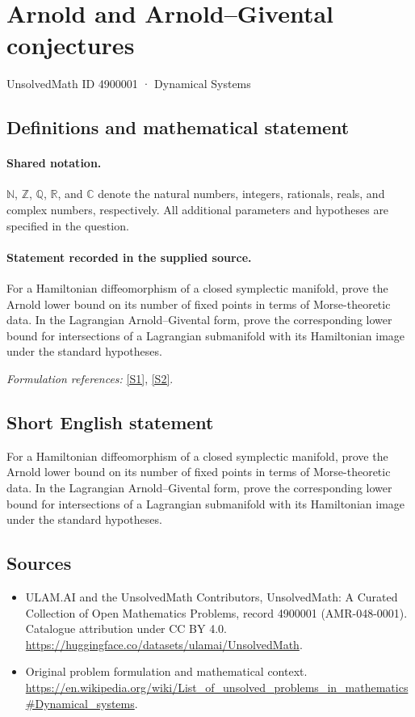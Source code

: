 \documentclass[11pt]{article}
\newcommand{\sref}[2]{\hyperlink{source:#1:#2}{[S#2]}}
\begin{document}
\setcounter{section}{4900000}
\section{Arnold and Arnold–Givental conjectures}\label{4900001}
{\small UnsolvedMath ID 4900001 · Dynamical Systems}
\subsection{Definitions and mathematical statement}

\paragraph{Shared notation.}$\mathbb N$, $\mathbb Z$, $\mathbb Q$, $\mathbb R$, and $\mathbb C$ denote the natural numbers, integers, rationals, reals, and complex numbers, respectively. All additional parameters and hypotheses are specified in the question.


\paragraph{Statement recorded in the supplied source.}
For a Hamiltonian diffeomorphism of a closed symplectic manifold, prove the Arnold lower bound on its number of fixed points in terms of Morse-theoretic data. In the Lagrangian Arnold–Givental form, prove the corresponding lower bound for intersections of a Lagrangian submanifold with its Hamiltonian image under the standard hypotheses.
\par\smallskip\textit{Formulation references:} \sref{4900001}{1}, \sref{4900001}{2}.
\subsection{Short English statement}
For a Hamiltonian diffeomorphism of a closed symplectic manifold, prove the Arnold lower bound on its number of fixed points in terms of Morse-theoretic data. In the Lagrangian Arnold–Givental form, prove the corresponding lower bound for intersections of a Lagrangian submanifold with its Hamiltonian image under the standard hypotheses.
\subsection{Sources}
\begin{itemize}
\item[\hypertarget{source:4900001:1}{S1}] ULAM.AI and the UnsolvedMath Contributors, UnsolvedMath: A Curated Collection of Open Mathematics Problems, record 4900001 (AMR-048-0001). Catalogue attribution under CC BY 4.0.
\url{https://huggingface.co/datasets/ulamai/UnsolvedMath}.
\item[\hypertarget{source:4900001:2}{S2}] Original problem formulation and mathematical context.
\url{https://en.wikipedia.org/wiki/List_of_unsolved_problems_in_mathematics#Dynamical_systems}.
\end{itemize}
\label{end:4900001}
\end{document}
